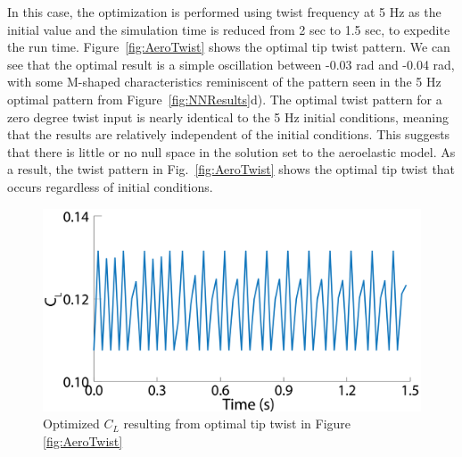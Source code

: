 \documentclass[11pt]{ucthesis}
\begin{document}
In this case, the optimization is performed using twist frequency at 5 Hz as the initial value and the simulation time is reduced from 2 sec to 1.5 sec, to expedite the run time. Figure~\ref{fig:AeroTwist} shows the optimal tip twist pattern. We can see that the optimal result is a simple oscillation between -0.03 rad and -0.04 rad, with some M-shaped characteristics reminiscent of the pattern seen in the 5 Hz optimal pattern from Figure~\ref{fig:NNResults}d). The optimal twist pattern for a zero degree twist input is nearly identical to the 5 Hz initial conditions, meaning that the results are relatively independent of the initial conditions. This suggests that there is little or no null space in the solution set to the aeroelastic model. As a result, the twist pattern in Fig.~\ref{fig:AeroTwist} shows the optimal tip twist that occurs regardless of initial conditions.

\begin{figure}[thpb]
\centering
\includegraphics[width=0.9\linewidth]{./Figures/AeroCLOpt-01.png}
\caption{Optimized $C_L$ resulting from optimal tip twist in Figure \ref{fig:AeroTwist}}
\label{fig:AeroCL}
\end{figure}
\end{document}
